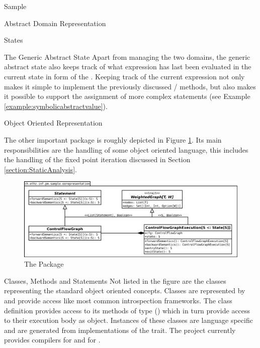\begin{chapter}{Sample}
\begin{section}{Abstract Domain Representation}
\begin{subsection}{States}
\begin{subsubsection}{The Generic Abstract State}
				Apart from managing the two domains, the generic abstract state also keeps track of what expression has last been evaluated in the current state in form of the  . Keeping track of the current expression not only makes it simple to implement the previously discussed / methods, but also makes it possible to support the assignment of more complex statements (see Example \ref{example:symbolicabstractvalue}).
			\end{subsubsection}
		\end{subsection}
	\end{section}


	\begin{section}{Object Oriented Representation}
		\label{section:objectorientedrepresentation}

		The other important package  is roughly depicted in Figure \ref{figure:oorepresentation}. Its main responsibilities are the handling of some object oriented language, this includes the handling of the fixed point iteration discussed in Section \ref{section:StaticAnalysis}.

		\begin{figure}
			\includegraphics[width=\textwidth]{Diagrams/oorepresentation.png}
			\caption{The  Package}
			\label{figure:oorepresentation}
		\end{figure}


		\begin{subsection}{Classes, Methods and Statements}
			Not listed in the figure are the classes representing the standard object oriented concepts. Classes are represented by  and provide access like most common introspection frameworks. The class definition provides access to its methods of type () which in turn provide access to their execution body as  object. Instances of these classes are language specific and are generated from implementations of the  trait. The \sample project currently provides compilers for \javabytecode and for \scala.


\end{subsection}
\end{section}
\end{chapter}
